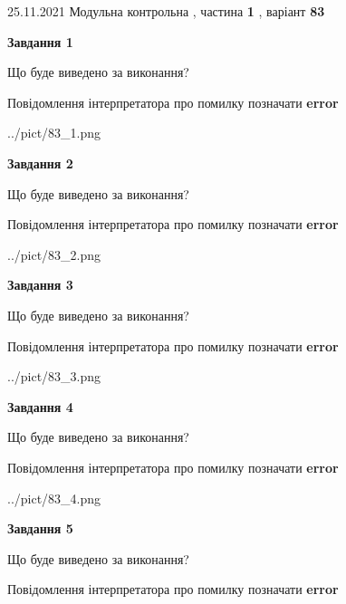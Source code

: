 \documentclass[10pt, ukrainian]{article}
\begin{document}
{25.11.2021 Модульна контрольна , частина \textbf { 1 }, варіант  \No \textbf { 83 }\par}
{
\begin {large}

{\begin {center}\textbf{Завдання 1}\end {center}}\par
Що буде виведено за виконання? \par
Повідомлення інтерпретатора про помилку позначати \textbf{error}

\begin{center}
	{../pict/83_1.png}
\end{center}
\newpage

{\begin {center}\textbf{Завдання 2}\end {center}}\par
Що буде виведено за виконання? \par
Повідомлення інтерпретатора про помилку позначати \textbf{error}

\begin{center}
	{../pict/83_2.png}
\end{center}
\newpage

{\begin {center}\textbf{Завдання 3}\end {center}}\par
Що буде виведено за виконання? \par
Повідомлення інтерпретатора про помилку позначати \textbf{error}

\begin{center}
	{../pict/83_3.png}
\end{center}
\newpage

{\begin {center}\textbf{Завдання 4}\end {center}}\par
Що буде виведено за виконання? \par
Повідомлення інтерпретатора про помилку позначати \textbf{error}

\begin{center}
	{../pict/83_4.png}
\end{center}
\newpage

{\begin {center}\textbf{Завдання 5}\end {center}}\par
Що буде виведено за виконання? \par
Повідомлення інтерпретатора про помилку позначати \textbf{error}


\end{large}}
\end{document}
